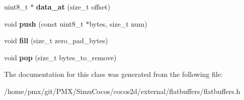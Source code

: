 \begin{DoxyCompactItemize}
\mbox{\label{classflatbuffers_1_1vector__downward_ae4ce8abc92218d53b2a3f37628ce4662}} 
uint8\+\_\+t $\ast$ {\bfseries data\+\_\+at} (size\+\_\+t offset)
\item 
\mbox{\label{classflatbuffers_1_1vector__downward_a8cfd1b66f93043acb9905519e9998ced}} 
void {\bfseries push} (const uint8\+\_\+t $\ast$bytes, size\+\_\+t num)
\item 
\mbox{\label{classflatbuffers_1_1vector__downward_a692f950a105db47f983ff80d4e5c3772}} 
void {\bfseries fill} (size\+\_\+t zero\+\_\+pad\+\_\+bytes)
\item 
\mbox{\label{classflatbuffers_1_1vector__downward_a23cd3d0692fe86eacc6324ea4b58a599}} 
void {\bfseries pop} (size\+\_\+t bytes\+\_\+to\+\_\+remove)
\end{DoxyCompactItemize}


The documentation for this class was generated from the following file\+:\begin{DoxyCompactItemize}
\item 
/home/pmx/git/\+P\+M\+X/\+Simu\+Cocos/cocos2d/external/flatbuffers/flatbuffers.\+h\end{DoxyCompactItemize}
